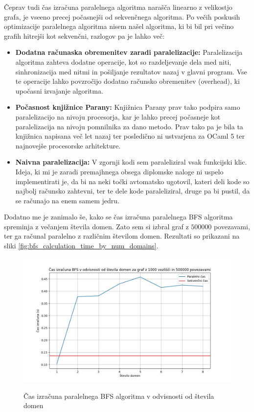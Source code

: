 \documentclass[mat1, tisk]{fmfdelo}
\begin{document}
Čeprav tudi čas izračuna paralelnega algoritma narašča linearno z velikostjo grafa, je vseeno precej počasnejši od
sekvenčnega algoritma. Po večih poskusih optimizacije paralelnega algoritma nisem našel algoritma, ki bi bil pri
večino grafih hitrejši kot sekvenčni, razlogov pa je lahko več:
\begin{itemize}
  \item \textbf{Dodatna računaska obremenitev zaradi paralelizacije: } Paralelizacija algoritma zahteva dodatne operacije, kot so 
        razdeljevanje dela med niti, sinhronizacija med nitmi in pošiljanje rezultatov nazaj v glavni program. 
        Vse te operacije lahko povzročijo dodatno računsko obremenitev (overhead), ki upočasni izvajanje algoritma.
  \item \textbf{Počasnost knjižnice Parany: } Knjižnica Parany prav tako podpira samo paralelizacijo na nivoju
        procesorja, kar je lahko precej počasneje kot paralelizacija na nivoju pomnilnika za dano metodo. Prav tako
        pa je bila ta knjižnica napisana več let nazaj ter posledično ni ustvarjena za OCaml 5 ter najnovejše
        procesorske arhitekture.
  \item \textbf{Naivna paralelizacija: } V zgornji kodi sem paraleliziral vsak funkcijski klic. Ideja, ki mi je zaradi
        premajhnega obsega diplomske naloge ni uspelo implementirati je, da bi na neki točki avtomatsko ugotovil,
        kateri deli kode so najbolj računsko zahtevni, ter te dele kode paraleliziral, druge pa bi pustil, da se
        računajo na enem samem jedru.
\end{itemize}

Dodatno me je zanimalo še, kako se čas izračuna paralelnega BFS algoritma spreminja z večanjem števila domen.
Zato sem si izbral graf z $500000$ povezavami, ter ga računal paralelno z različnim številom domen. Rezultati so
prikazani na sliki \ref{fig:bfs_calculation_time_by_num_domains}.

\begin{figure}[h!]
  \centering
  \caption{Čas izračuna paralelnega BFS algoritma v odvisnosti od števila domen}
  \includegraphics[width=15cm]{slike/bfs_v_odvisnosti_od_stevila_domen.jpg}
  \label{fig:bfs_calculation_time_by_graph_size}
\end{figure}
\end{document}
